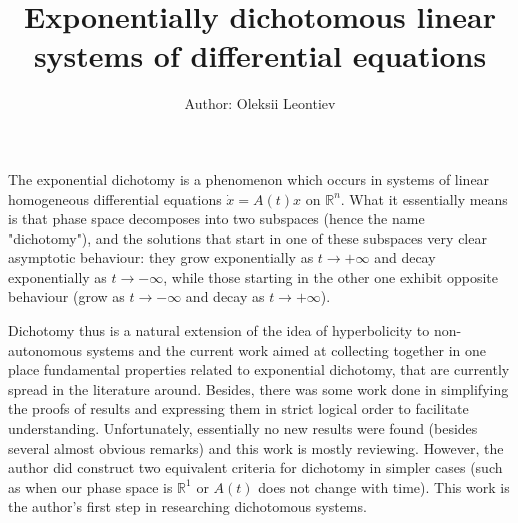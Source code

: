 \documentclass[8pt]{article} %
\title{Exponentially dichotomous linear systems of differential equations}
\author{Author: Oleksii Leontiev}
\date{}
\begin{document}
\maketitle
The exponential dichotomy is a phenomenon which occurs in systems of linear homogeneous
differential equations $\dot{x}=A(t)x$ on $\mathbb{R}^n$. What it essentially means is that
phase space decomposes into two subspaces (hence the name "dichotomy"), and the solutions that start in one of these subspaces
very clear asymptotic behaviour: they grow exponentially as $t\to+\infty$ and decay exponentially as $t\to-\infty$, while those starting
in the other one exhibit opposite behaviour (grow as $t\to-\infty$ and decay as $t\to+\infty$).

Dichotomy thus is a natural extension of the idea of hyperbolicity to non-autonomous systems and the current work aimed at collecting together
in one place fundamental properties related to exponential dichotomy, that are currently spread in the literature around. Besides, there
was some work done in simplifying the proofs of results and expressing them in strict logical order to facilitate understanding. Unfortunately,
essentially no new results were found (besides several almost obvious remarks)
 and this work is mostly reviewing. However, the author did construct two equivalent criteria for dichotomy in simpler cases (such as when our
phase space is $\mathbb{R}^1$ or $A(t)$ does not change with time). This work is the author's first step in researching dichotomous systems.
\end{document}
